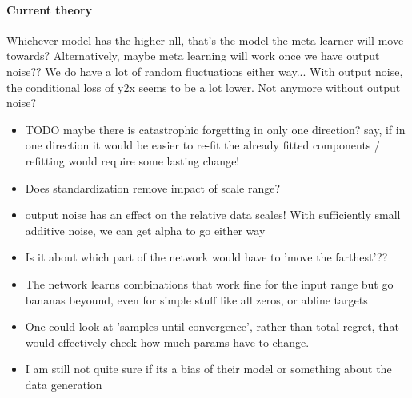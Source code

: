 \documentclass{article}
\begin{document}
\paragraph{Current theory}
Whichever model has the higher nll, that's the model the meta-learner will move towards?
Alternatively, maybe meta learning will work once we have output noise??
We do have a lot of random fluctuations either way...
With output noise, the conditional loss of y2x seems to be a lot lower. Not anymore without output noise?
\begin{itemize}
    \item TODO maybe there is catastrophic forgetting in only one direction? say, if in one direction it would be easier to re-fit the already fitted components / refitting would require some lasting change!
    \item Does standardization remove impact of scale range?
    \item output noise has an effect on the relative data scales! With sufficiently small additive noise, we can get alpha to go either way
    \item Is it about which part of the network would have to 'move the farthest'??
    \item The network learns combinations that work fine for the input range but go bananas beyound, even for simple stuff like all zeros, or abline targets
    \item One could look at 'samples until convergence', rather than total regret, that would effectively check how much params have to change.
    \item I am still not quite sure if its a bias of their model or something about the data generation
\end{itemize}

\clearpage
\end{document}

